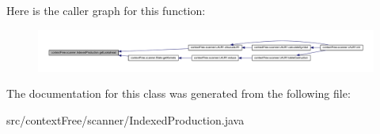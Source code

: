 Here is the caller graph for this function\-:\nopagebreak
\begin{figure}[H]
\begin{center}
\leavevmode
\includegraphics[width=350pt]{classcontext_free_1_1scanner_1_1_indexed_production_a45b191078f89a67427a2593b67ae4f1e_icgraph}
\end{center}
\end{figure}




The documentation for this class was generated from the following file\-:\begin{DoxyCompactItemize}
\item 
src/context\-Free/scanner/Indexed\-Production.\-java\end{DoxyCompactItemize}
